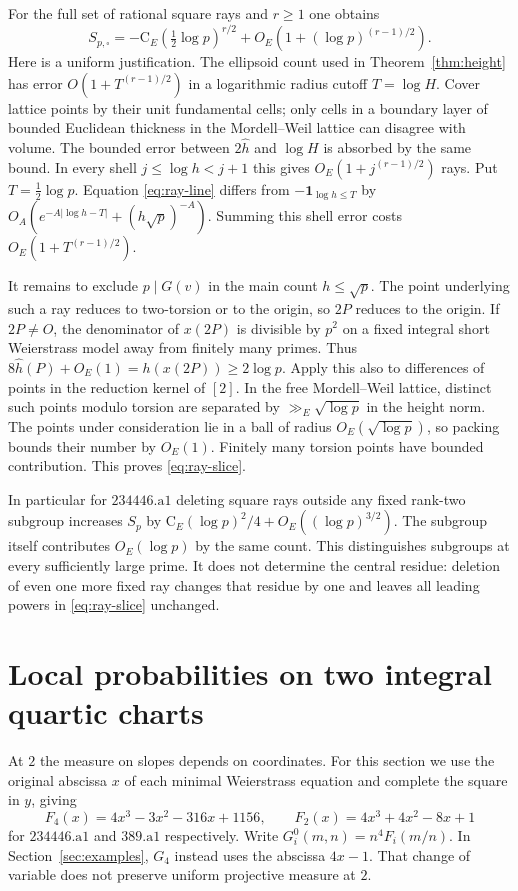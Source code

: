 \documentclass[11pt]{article}
\begin{document}
For the full set of rational square rays and $r\ge1$ one obtains
\begin{equation}\label{eq:ray-slice}
 S_{p,\square}
 =-\mathrm C_E\left(\tfrac12\log p\right)^{r/2}
      +O_E\!\left(1+(\log p)^{(r-1)/2}\right).
\end{equation}
Here is a uniform justification. The ellipsoid count used in
Theorem~\ref{thm:height} has error $O(1+T^{(r-1)/2})$ in a
logarithmic radius cutoff $T=\log H$. Cover lattice points by their
unit fundamental cells; only cells in a boundary layer of bounded
Euclidean thickness in the Mordell--Weil lattice can disagree with
volume. The bounded error between $2\widehat h$ and $\log H$ is
absorbed by the same bound. In every shell $j\le\log h<j+1$ this
gives $O_E(1+j^{(r-1)/2})$ rays. Put $T=\tfrac12\log p$. Equation
\eqref{eq:ray-line} differs from $-\mathbf1_{\log h\le T}$ by
$O_A(e^{-A|\log h-T|}+ (h\sqrt p)^{-A})$. Summing this shell
error costs $O_E(1+T^{(r-1)/2})$.

It remains to exclude $p\mid G(v)$ in the main count $h\le\sqrt p$.
The point underlying such a ray reduces to two-torsion or to the
origin, so $2P$ reduces to the origin. If $2P\ne O$, the denominator
of $x(2P)$ is divisible by $p^2$ on a fixed integral short
Weierstrass model away from finitely many primes. Thus
$8\widehat h(P)+O_E(1)=h(x(2P))\ge2\log p$.
Apply this also to differences of points in the reduction kernel
of $[2]$. In the free Mordell--Weil lattice, distinct such points
modulo torsion are separated by $\gg_E\sqrt{\log p}$ in the height
norm. The points under consideration lie in a ball of radius
$O_E(\sqrt{\log p})$, so packing bounds their number by $O_E(1)$.
Finitely many torsion points have bounded contribution. This proves
\eqref{eq:ray-slice}.

In particular for $234446.\mathrm{a}1$ deleting square rays outside
any fixed rank-two subgroup increases $S_p$ by
$\mathrm C_E(\log p)^2/4+O_E((\log p)^{3/2})$. The subgroup itself
contributes $O_E(\log p)$ by the same count. This distinguishes
subgroups at every sufficiently large prime. It does not determine
the central residue: deletion of even one more fixed ray changes that
residue by one and leaves all leading powers in \eqref{eq:ray-slice}
unchanged.
\section{Local probabilities on two integral quartic charts}

At $2$ the measure on slopes depends on coordinates. For this section
we use the original abscissa $x$ of each minimal Weierstrass equation
and complete the square in $y$, giving
\[
 F_4(x)=4x^3-3x^2-316x+1156,\qquad F_2(x)=4x^3+4x^2-8x+1
\]
for $234446.\mathrm{a}1$ and $389.\mathrm{a}1$ respectively.
Write $G_i^0(m,n)=n^4 F_i(m/n)$. In Section~\ref{sec:examples},
$G_4$ instead uses the abscissa $4x-1$. That change of variable
does not preserve uniform projective measure at $2$.
\end{document}
